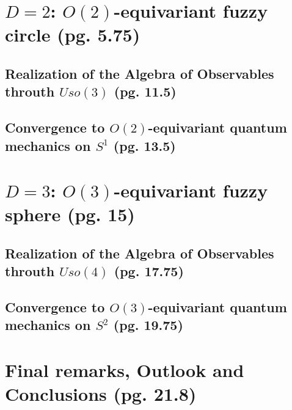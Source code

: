 \documentclass{article}
\begin{document}
\section{$D=2$: $O(2)$-equivariant fuzzy circle (pg. 5.75)}

\subsection{Realization of the Algebra of Observables throuth $Uso(3)$ (pg. 11.5)}

\subsection{Convergence to $O(2)$-equivariant quantum mechanics on $S^1$ (pg. 13.5)}

\section{$D=3$: $O(3)$-equivariant fuzzy sphere (pg. 15)}

\subsection{Realization of the Algebra of Observables throuth $Uso(4)$ (pg. 17.75)}

\subsection{Convergence to $O(3)$-equivariant quantum mechanics on $S^2$ (pg. 19.75)}

\section{Final remarks, Outlook and Conclusions (pg. 21.8)}
\end{document}
